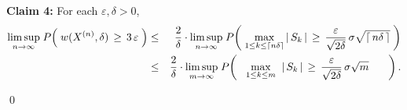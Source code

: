 \vskip 0.5cm
\begin{center}
\begin{minipage}{6.5in}
\noindent
\textbf{Claim 4:}\quad
For each $\varepsilon, \delta > 0$,
\begin{eqnarray*}
	\underset{n\rightarrow\infty}{\limsup}\;
	P\!\left(\; w(X^{(n)},\delta) \,\overset{{\color{white}.}}{\geq}\, 3\,\varepsilon \;\right)
&\leq& \dfrac{2}{\delta}\cdot
	\underset{n\rightarrow\infty}{\limsup}\;
	P\!\left(\;
	\underset{1 \leq k\leq\lceil n\delta \rceil}{\max}\,\vert\,S_{k}\,\vert
	\,\overset{{\color{white}.}}{\geq}\,
	\dfrac{\varepsilon}{\sqrt{2\delta}}\,\sigma\sqrt{\lceil\,n\delta\,\rceil} 
	\;\right)
\\
&\leq& \dfrac{2}{\delta}\cdot
	\underset{m\rightarrow\infty}{\limsup}\;
	P\!\left(\;\;\;
	\underset{1 \leq k\leq m}{\max}\;\;\vert\,S_{k}\,\vert
	\,\overset{{\color{white}.}}{\geq}\,
	\dfrac{\varepsilon}{\sqrt{2\delta}}\,\sigma\sqrt{m} 
	\quad\;\;\;\right).
\end{eqnarray*}
\end{minipage}
\end{center}

\qed

